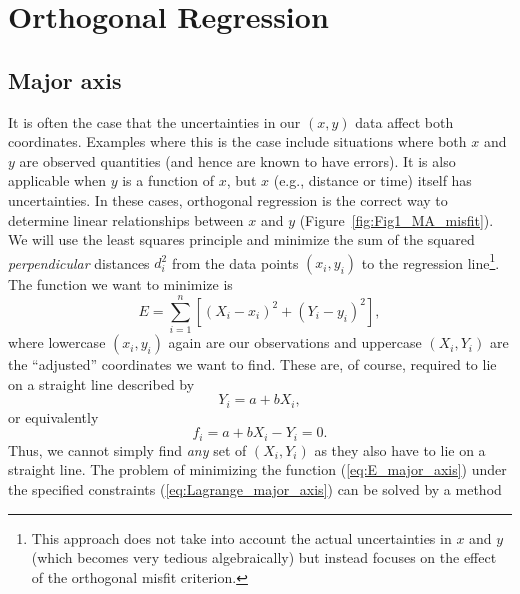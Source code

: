 \section{Orthogonal Regression}
\subsection{Major axis}

	It is often the case that the uncertainties in our $(x,y)$ data affect both coordinates.  
Examples where this is the case include situations where both $x$ and $y$ are observed quantities 
(and hence are known to have errors).  It is also  applicable when $y$ is a function of $x$, but $x$ (e.g., distance 
or time) itself has uncertainties.  In these cases, orthogonal regression is the correct way to 
determine linear relationships between $x$ and $y$ (Figure~\ref{fig:Fig1_MA_misfit}).
We will use the least squares principle and minimize the sum of the squared \emph{perpendicular} 
distances $d_i^2$ from the data points $(x_i,y_i)$ to the regression line\footnote{This approach does not take into account
the actual uncertainties in $x$ and $y$ (which becomes very tedious algebraically) but instead focuses on the effect
of the orthogonal misfit criterion.}.  The function we want to minimize is
\begin{equation}
E = \sum_{i=1}^n \left [ (X_i - x_i)^2 + (Y_i - y_i)^2 \right ],
\label{eq:E_major_axis}
\end{equation}	 	
where lowercase $(x_i, y_i)$ again are our observations and uppercase $(X_i, Y_i)$ are the ``adjusted'' 
coordinates we want to find.  These are, of course, required to  lie on a straight line described by
\begin{equation}
Y_i = a + bX_i,
\label{eq:line_constraint}
\end{equation}	
or equivalently
\begin{equation}
f_i = a + bX_i - Y_i = 0.
\label{eq:Lagrange_major_axis}
\end{equation}
Thus, we cannot simply find \emph{any} set of $(X_i, Y_i)$ as they also have to lie on a straight line.  The problem 
of minimizing the function (\ref{eq:E_major_axis}) under the specified constraints (\ref{eq:Lagrange_major_axis}) can be solved by a method 

